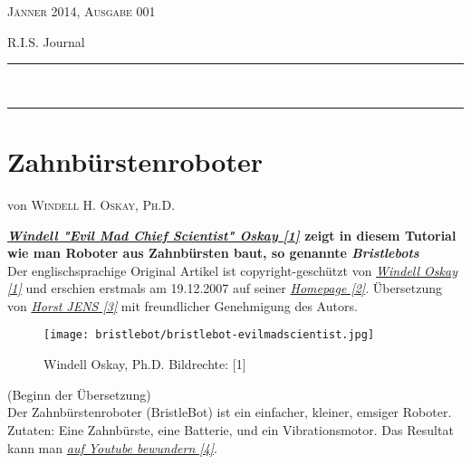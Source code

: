 \documentclass[10pt,a4paper,ngerman,twoside]{article} %
\newcommand{\HorRule}[1]{\noindent\rule{\linewidth}{#1}} %
\newcommand{\NewsletterName}[1]{ %
\begin{center}
\Huge \usefont{T1}{fvs}{b}{n} %
#1
\end{center}	
\par \normalsize \normalfont}
\newcommand{\JournalIssue}[1]{ %
\hfill \textsc{Jänner 2014, Ausgabe 001}
\par \normalsize \normalfont}
\newcommand{\NewsItem}[1]{ %
\usefont{T1}{fvs}{n}{n} %
\vspace{24pt}\large #1\vspace{3pt} %
\par \normalsize \normalfont}
\newcommand{\NewsAuthor}[1]{ %
\hfill von \textsc{#1} \vspace{20pt} %
\par \normalfont}
\begin{document}
\JournalIssue{1} %
\NewsletterName{R.I.S. Journal} %
\noindent\HorRule{3pt} \\[-0.75\baselineskip] %
\HorRule{1pt} %




%

\NewsItem{}
\section*{Zahnbürstenroboter} 
\label{bristlebot}
\NewsAuthor{Windell H. Oskay, Ph.D.}


\textbf{\href{http://www.evilmadscientist.com/about/}{\textit{Windell "Evil Mad Chief Scientist" Oskay [1]}} zeigt in diesem Tutorial wie man Roboter aus Zahnbürsten baut, so genannte \textit{Bristlebots}} \\

Der englischsprachige Original Artikel ist copyright-geschützt von \href{http://www.evilmadscientist.com/about/}{\textit{Windell Oskay [1]}} und erschien erstmals am 19.12.2007 auf seiner \href{http://www.evilmadscientist.com/go/bristlebot}{\textit{Homepage [2]}}. Übersetzung von \href{http://spielend-programmieren.at}{\textit{Horst JENS [3]}} mit freundlicher Genehmigung des Autors.

\begin{figure}
\texttt{[image: bristlebot/bristlebot-evilmadscientist.jpg]}\\
\caption{Windell Oskay, Ph.D. Bildrechte: [1]}
\end{figure}

(Beginn der Übersetzung) \\

Der Zahnbürstenroboter (BristleBot) ist ein einfacher, kleiner, emsiger Roboter. Zutaten: Eine Zahnbürste, eine Batterie, und ein Vibrationsmotor. Das Resultat kann man \href{http://youtu.be/rUSTXUis_ys}{\textit{auf Youtube bewundern [4]}}.
\end{document}
